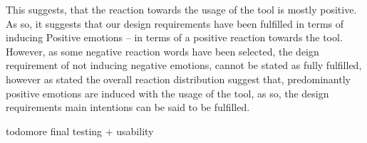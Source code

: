 This suggests, that the reaction towards the usage of the tool is mostly positive.  As so, it suggests that our design requirements have been fulfilled in terms of inducing Positive emotions – in terms of a positive reaction towards the tool. However, as some negative reaction words have been selected, the deign requirement of not inducing negative emotions, cannot be stated as fully fulfilled, however as stated the overall reaction distribution suggest that, predominantly positive emotions are induced with the usage of the tool, as so, the design requirements main intentions can be said to be fulfilled. 















todo{more final testing + usability }